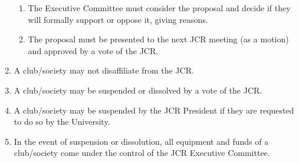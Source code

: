 \documentclass[12pt]{article}
\begin{document}
\begin{enumerate}
\begin{enumerate}
        \item The Executive Committee must consider the proposal and decide if they will formally support or oppose it, giving reasons.
        \item The proposal must be presented to the next JCR meeting (as a motion) and approved by a vote of the JCR.
    \end{enumerate}
    \item A club/society may not disaffiliate from the JCR.
    \item A club/society may be suspended or dissolved by a vote of the JCR.
    \item A club/society may be suspended by the JCR President if they are requested to do so by the University.
    \item In the event of suspension or dissolution, all equipment and funds of a club/society come under the control of the JCR Executive Committee.
\end{enumerate}
\newpage
\end{document}
